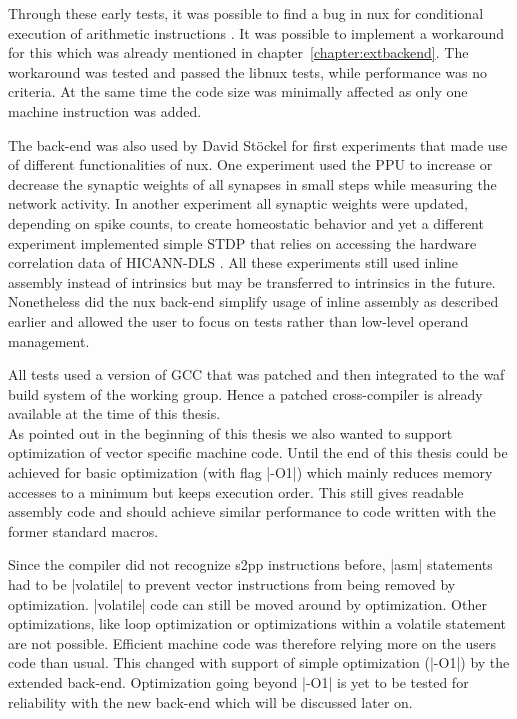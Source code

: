 Through these early tests, it was possible to find a bug in nux for conditional execution of arithmetic instructions \cite{reponux}.
It was possible to implement a workaround for this which was already mentioned in chapter~\ref{chapter:extbackend}.
The workaround was tested and passed the libnux tests, while performance was no criteria.
At the same time the code size was minimally affected as only one machine instruction was added.

The back-end was also used by David Stöckel for first experiments that made use of different functionalities of nux.
One experiment used the \ac{PPU} to increase or decrease the synaptic weights of all synapses in small steps while measuring the network activity.
In another experiment all synaptic weights were updated, depending on spike counts, to create homeostatic behavior and yet a different experiment implemented simple \ac{STDP} that relies on accessing the hardware correlation data of \ac{HICANN-DLS} \cite{repostdp}.
All these experiments still used inline assembly instead of intrinsics but may be transferred to intrinsics in the future.
Nonetheless did the nux back-end simplify usage of inline assembly as described earlier and allowed the user to focus on tests rather than low-level operand management.

All tests used a version of \ac{GCC} that was patched and then integrated to the waf build system of the working group.
Hence a patched cross-compiler is already available at the time of this thesis.
\\
As pointed out in the beginning of this thesis we also wanted to support optimization of vector specific machine code.
Until the end of this thesis could be achieved for basic optimization (with flag |-O1|) which mainly reduces memory accesses to a minimum but keeps execution order.
This still gives readable assembly code and should achieve similar performance to code written with the former standard macros.

Since the compiler did not recognize \ac{s2pp} instructions before, |asm| statements had to be |volatile| to prevent vector instructions from being removed by optimization.
|volatile| code can still be moved around by optimization.
Other optimizations, like loop optimization or optimizations within a volatile statement are not possible.
Efficient machine code was therefore relying more on the users code than usual.
This changed with support of simple optimization (|-O1|) by the extended back-end.
Optimization going beyond |-O1| is yet to be tested for reliability with the new back-end which will be discussed later on.

